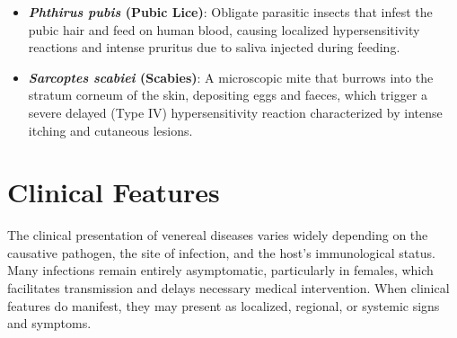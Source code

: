 \begin{itemize}
    \begin{itemize}
        \item \textbf{\textit{Phthirus pubis} (Pubic Lice)}: Obligate parasitic insects that infest the pubic hair and feed on human blood, causing localized hypersensitivity reactions and intense pruritus due to saliva injected during feeding.
        \item \textbf{\textit{Sarcoptes scabiei} (Scabies)}: A microscopic mite that burrows into the stratum corneum of the skin, depositing eggs and faeces, which trigger a severe delayed (Type IV) hypersensitivity reaction characterized by intense itching and cutaneous lesions.
    \end{itemize}
\end{itemize}

\section*{Clinical Features}
The clinical presentation of venereal diseases varies widely depending on the causative pathogen, the site of infection, and the host's immunological status. Many infections remain entirely asymptomatic, particularly in females, which facilitates transmission and delays necessary medical intervention. When clinical features do manifest, they may present as localized, regional, or systemic signs and symptoms.

